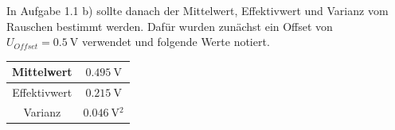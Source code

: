 \documentclass{article}						%
\begin{document}
		\begin{figure}[h!]
		\end{figure}
		
		In Aufgabe 1.1 b) sollte danach der Mittelwert, Effektivwert und Varianz vom Rauschen bestimmt werden. Dafür wurden zunächst ein Offset von $ U_{Offset} = \SI{0,5}{\volt} $ verwendet und folgende Werte notiert. \\
		\begin{center}
			\begin{tabular}{|c|c|}
			\hline Mittelwert & $ \SI{0,495}{\volt} $ \\ 
			\hline Effektivwert & $ \SI{0,215}{\volt} $ \\ 
			\hline Varianz & $ \SI{0,046}{\volt^2} $ \\ 
			\hline 
			\end{tabular} 
		\end{center}
		
\end{document}
